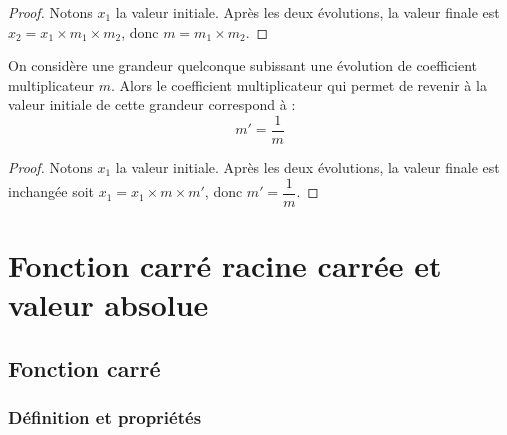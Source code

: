 \documentclass[a4paper, 12pt]{report}
\begin{document}
\begin{proof}
Notons $x_1$ la valeur initiale. Après les deux évolutions, la valeur finale est $x_2 = x_1 \times m_1 \times m_2$, 
donc $m = m_1 \times m_2$.
\end{proof}

\begin{thm}
On considère une grandeur quelconque subissant une évolution de coefficient multiplicateur $m$.
Alors le coefficient multiplicateur qui permet de revenir à la valeur initiale de cette grandeur correspond à :
\[ m' = \dfrac1{m} \]

	\begin{center}
	\end{center}
\end{thm}

\begin{proof}
Notons $x_1$ la valeur initiale. Après les deux évolutions, la valeur finale est inchangée soit $x_1 = x_1 \times m \times m'$, 
donc $m'=\dfrac1{m}$.
\end{proof}

\chapter{Fonction carré racine carrée et valeur absolue}

\section{Fonction carré}

\subsection{Définition et propriétés}
\end{document}
